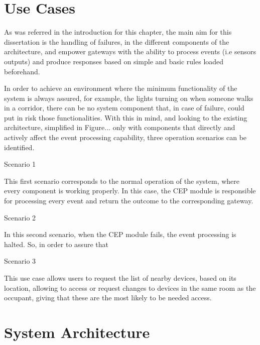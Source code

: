 \section{Use Cases}
\label{Architecture:usecases}

As was referred in the introduction for this chapter, the main aim for this dissertation is the handling of failures, in the different components of the architecture, and empower gateways with the ability to process events (i.e sensors outputs) and produce responses based on simple and basic rules loaded beforehand.

In order to achieve an environment where the minimum functionality of the system is always assured, for example, the lights turning on when someone walks in a corridor, there can be no system component that, in case of failure, could put in risk those functionalities. With this in mind, and looking to the existing architecture, simplified in Figure... only with components that directly and actively affect the event processing capability, three operation scenarios can be identified. 

\begin{Paragraph}{Scenario 1}
	
	This first scenario corresponds to the normal operation of the system, where every component is working properly. In this case, the CEP module is responsible for processing every event and return the outcome to the corresponding gateway.
	
\end{Paragraph}

\begin{Paragraph}{Scenario 2}
	
	In this second scenario, when the CEP module fails, the event processing is halted. So, in order to assure that 
	
\end{Paragraph}

\begin{Paragraph}{Scenario 3}
	
	This use case allows users to request the list of nearby devices, based on its location, allowing to access or request changes to devices in the same room as the occupant, giving that these are the most likely to be needed access.
	
\end{Paragraph}

\section{System Architecture}
\label{Architecture:Architecture}

